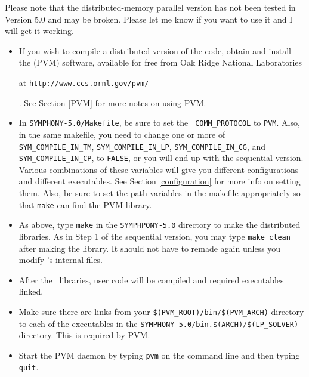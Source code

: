 Please note that the distributed-memory parallel version has not been tested
in Version 5.0 and may be broken. Please let me know if you want to use it and
I will get it working.

\begin{itemize}
        \item If you wish to compile a distributed version of the code, obtain
and install the {\em {}} (PVM) software, available for free
from Oak Ridge National Laboratories
\begin{latexonly}
        at {\tt http://www.ccs.ornl.gov/pvm/}
\end{latexonly}. 
        See Section \ref{PVM} for more notes on using PVM.
        
        \item In \texttt{SYMPHONY-5.0/Makefile}, be sure to set the {\tt
        COMM\_PROTOCOL} to {\tt PVM}. Also, in
        the same makefile, you need to change one or more of {\tt
        SYM\_COMPILE\_IN\_TM}, {\tt SYM\_COMPILE\_IN\_LP}, 
	{\tt SYM\_COMPILE\_IN\_CG}, and
        {\tt SYM\_COMPILE\_IN\_CP}, to {\tt FALSE}, or you will end up with the
        sequential version. Various combinations of these variables will give
        you different configurations and different executables. See Section
        \ref{configuration} for more info on setting them. Also, be sure to
        set the path variables in the makefile appropriately so that 
	\texttt{make} can find the PVM library.

        \item As above, type {\tt make} in the \texttt{SYMPHPONY-5.0} 
	directory to
        make the distributed libraries. As in Step 1 of the sequential
        version, you may type {\tt make clean} after making the
        library. It should not have to remade again unless you modify
        \BB's internal files.

        \item After the \BB\ libraries, user code will be compiled and
        required executables linked.

        \item Make sure there are links from your
        \texttt{\$(PVM\_ROOT)/bin/\$(PVM\_ARCH)} directory to each of the
        executables in the
        \texttt{SYMPHONY-5.0/bin.\$(ARCH)/\$(LP\_SOLVER)} directory. 
	This is required by PVM.

        \item Start the PVM daemon by typing {\tt pvm} on the command line
        and then typing {\tt quit}.


\end{itemize}
